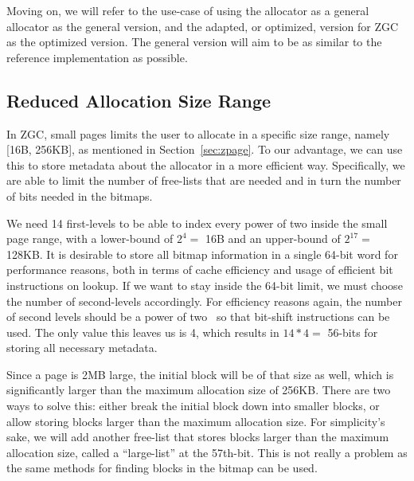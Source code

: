 Moving on, we will refer to the use-case of using the allocator as a general allocator as the general version, and the adapted, or optimized, version for ZGC as the optimized version. The general version will aim to be as similar to the reference implementation as possible.

\subsection{Reduced Allocation Size Range}
\label{sec:adaptations:reduced_allocation_range}

In ZGC, small pages limits the user to allocate in a specific size range, namely [16B, 256KB], as mentioned in Section~\ref{sec:zpage}. To our advantage, we can use this to store metadata about the allocator in a more efficient way. Specifically, we are able to limit the number of free-lists that are needed and in turn the number of bits needed in the bitmaps.

We need 14 first-levels to be able to index every power of two inside the small page range, with a lower-bound of $2^4 =$ 16B and an upper-bound of $2^{17} =$ 128KB. It is desirable to store all bitmap information in a single 64-bit word for performance reasons, both in terms of cache efficiency and usage of efficient bit instructions on lookup. If we want to stay inside the 64-bit limit, we must choose the number of second-levels accordingly. For efficiency reasons again, the number of second levels should be a power of two~\cite{TLSF} so that bit-shift instructions can be used. The only value this leaves us is 4, which results in $14 * 4 =$ 56-bits for storing all necessary metadata.

Since a page is 2MB large, the initial block will be of that size as well, which is significantly larger than the maximum allocation size of 256KB. There are two ways to solve this: either break the initial block down into smaller blocks, or allow storing blocks larger than the maximum allocation size. For simplicity's sake, we will add another free-list that stores blocks larger than the maximum allocation size, called a ``large-list'' at the 57th-bit. This is not really a problem as the same methods for finding blocks in the bitmap can be used.

